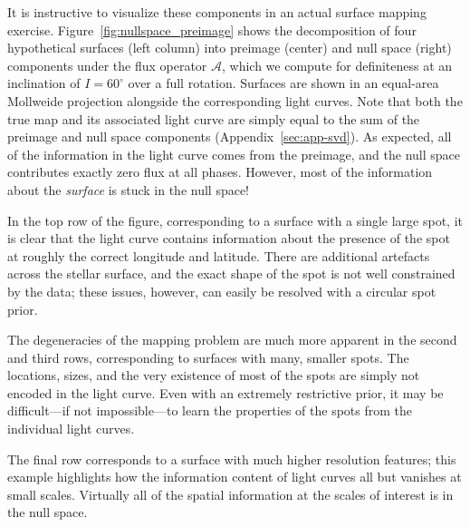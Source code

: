 \documentclass[modern]{aastex62}
\begin{document}
It is instructive to visualize these components in
an actual surface mapping exercise. Figure~\ref{fig:nullspace_preimage}
shows the decomposition of four hypothetical surfaces (left
column) into preimage (center) and null space (right)
components under the flux operator $\pmb{\mathcal{A}}$, which we compute for
definiteness at an inclination of $I = 60^\circ$ over a full rotation.
Surfaces are shown in an equal-area Mollweide projection alongside
the corresponding light curves.
Note that both the true map and its associated light curve are simply equal to
the sum of the preimage and null space components (Appendix~\ref{sec:app-svd}).
%
As expected, all of the information in the light curve comes
from the preimage, and the null space contributes exactly zero
flux at all phases. However, most of the information about the
\emph{surface} is stuck in the null space!

In the top row of the figure, corresponding to a surface with
a single large spot, it is clear that the light curve
contains information about the presence of the spot at roughly the
correct longitude and latitude. There are additional artefacts
across the stellar surface, and the exact shape of the spot is
not well constrained by the data; these issues, however, can
easily be resolved with a circular spot prior.

The degeneracies of the mapping problem are much more apparent
in the second and third rows, corresponding to surfaces with
many, smaller spots. The locations, sizes, and the very existence
of most of the spots are simply not encoded in the light curve.
Even with an extremely restrictive prior, it may be difficult---if
not impossible---to learn the properties of the spots
from the individual light curves.

The final row corresponds to a surface with much higher resolution
features; this example highlights how the information content of
light curves all but vanishes at small scales. Virtually all of the
spatial information at the scales of interest is in the null space.
\end{document}
